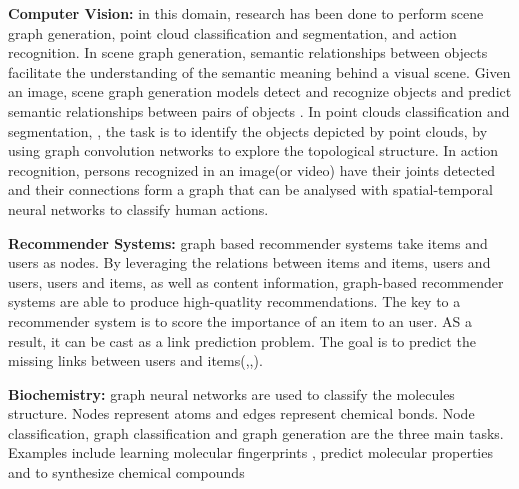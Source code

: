 \textbf{Computer Vision:} in this domain, research has been done to perform scene graph generation, point cloud classification and segmentation, and action recognition. In scene graph generation, semantic relationships between objects facilitate the understanding of the semantic meaning behind a visual scene. Given an image, scene graph generation models detect and recognize objects and predict semantic relationships between pairs of objects \cite{121}. In point clouds classification and segmentation, \cite{125}, the task is to identify the objects depicted by point clouds, by using graph convolution networks to explore the topological structure. In action recognition, persons recognized in an image(or video) have their joints detected and their connections form a graph that can be analysed with spatial-temporal neural networks to classify human actions.

\textbf{Recommender Systems:} graph based recommender systems take items and users as nodes. By leveraging the relations between items and items, users and users, users and items, as well as content information, graph-based recommender systems are able to produce high-quatlity recommendations. The key to a recommender system is to score the importance of an item to an user. AS a result, it can be cast as a link prediction problem. The goal is to predict the missing links between users and items(\cite{9},\cite{10},\cite{11}).

\textbf{Biochemistry:} graph neural networks are used to classify the molecules structure. Nodes represent atoms and edges represent chemical bonds. Node classification, graph classification and graph generation are the three main tasks. Examples include learning molecular fingerprints \cite{52}, predict molecular properties \cite{mpnn} and to synthesize chemical compounds \cite{65}


